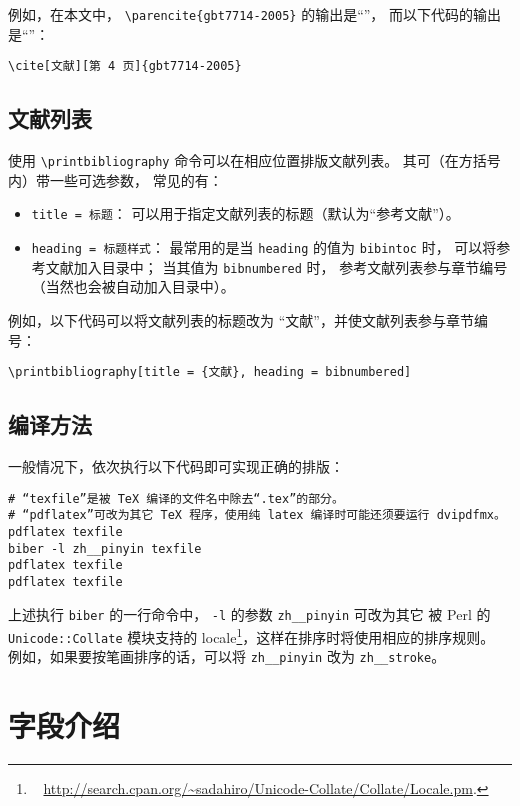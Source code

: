 \documentclass[UTF8]{ctexart}
\begin{document}
例如，在本文中，%
\verb|\parencite{gbt7714-2005}| 的输出是“\parencite{gbt7714-2005}”，
而以下代码的输出是“\cite[文献][第 4 页]{gbt7714-2005}”：
\begin{Verbatim}
\cite[文献][第 4 页]{gbt7714-2005}
\end{Verbatim}

\subsection{文献列表}

使用 \verb|\printbibliography| 命令可以在相应位置排版文献列表。
其可（在方括号内）带一些可选参数\supercite{biblatex}，
常见的有：
\begin{itemize}
	\item \verb|title = 标题|：
		可以用于指定文献列表的标题（默认为“参考文献”）。
	\item \verb|heading = 标题样式|：
		最常用的是当 \verb|heading| 的值为 \verb|bibintoc| 时，
		可以将参考文献加入目录中；
		当其值为 \verb|bibnumbered| 时，
		参考文献列表参与章节编号（当然也会被自动加入目录中）。
\end{itemize}

例如，以下代码可以将文献列表的标题改为 “文献”，并使文献列表参与章节编号：
\begin{Verbatim}
\printbibliography[title = {文献}, heading = bibnumbered]
\end{Verbatim}

\subsection{编译方法}

一般情况下，依次执行以下代码即可实现正确的排版：
\begin{Verbatim}
# “texfile”是被 TeX 编译的文件名中除去“.tex”的部分。
# “pdflatex”可改为其它 TeX 程序，使用纯 latex 编译时可能还须要运行 dvipdfmx。
pdflatex texfile
biber -l zh__pinyin texfile
pdflatex texfile
pdflatex texfile
\end{Verbatim}

上述执行 \verb|biber| 的一行命令中，%
\verb|-l| 的参数 \verb|zh__pinyin| 可改为其它
被 Perl 的 \verb|Unicode::Collate| 模块支持的 locale\footnote{\ %
	\url{http://search.cpan.org/~sadahiro/Unicode-Collate/Collate/Locale.pm}.%
}，这样在排序时将使用相应的排序规则。
例如，如果要按笔画排序的话，可以将 \verb|zh__pinyin| 改为 \verb|zh__stroke|。

\section{字段介绍}\label{sec:fields}
\end{document}

